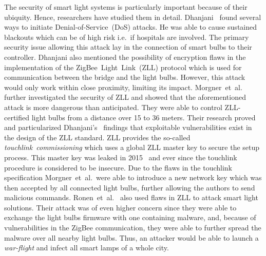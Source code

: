 The security of smart light systems is particularly important because of their ubiquity. Hence, researchers have studied them in detail.
Dhanjani~\cite{Dhanjani:2013:HLSEPHPWLS} found several ways to initiate Denial-of-Service~(DoS) attacks.
He was able to cause sustained blackouts which can be of high risk i.e.\ if hospitals are involved.
The primary security issue allowing this attack lay in the connection of smart bulbs to their controller.
Dhanjani also mentioned the possibility of encryption flaws in the implementation of the ZigBee~Light~Link~(ZLL) protocol which is used for communication between the bridge and the light bulbs. However, this attack would only work within close proximity, limiting its impact.
Morgner~et~al.~\cite{Morgner:2016:AYBBUICSSCLS} further investigated the security of ZLL and showed that the aforementioned attack is more dangerous than anticipated.
They were able to control ZLL-certified light bulbs from a distance over 15 to 36 meters.
Their research proved and particularized Dhanjani's~\cite{Dhanjani:2013:HLSEPHPWLS} findings that exploitable vulnerabilities exist in the design of the ZLL standard.
ZLL provides the so-called \textit{touchlink~commissioning} which uses a global ZLL master key to secure the setup process.
This master key was leaked in 2015~\cite{Morgner:2016:AYBBUICSSCLS} and ever since the touchlink procedure is considered to be insecure.
Due to the flaws in the touchlink specification Morgner~et~al.\ were able to introduce a new network key which was then accepted by all connected light bulbs, further allowing the authors to send malicious commands.
Ronen~et~al.~\cite{Ronen:2018:IGNCZCR} also used flaws in ZLL to attack smart light solutions.
Their attack was of even higher concern since they were able to exchange the light bulbs firmware with one containing malware, and, because of vulnerabilities in the ZigBee communication, they were able to further spread the malware over all nearby light bulbs.
Thus, an attacker would be able to launch a \textit{war-flight} and infect all smart lamps of a whole city.


